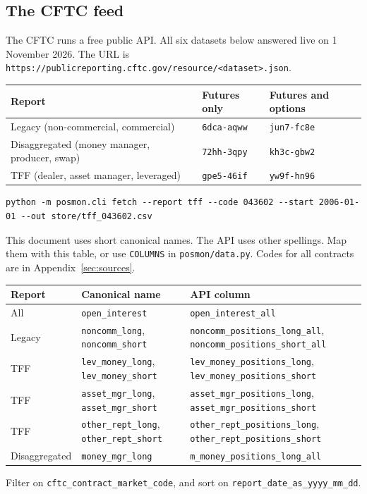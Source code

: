 \documentclass[11pt,a4paper]{article}
\newcommand{\code}[1]{\nolinkurl{#1}}
\newcommand{\sublabel}[1]{\par\vspace{3pt}\needspace{3\baselineskip}{\sffamily\small\bfseries #1}\par\nopagebreak[4]\vspace{1pt}}
\begin{document}
\subsection{The CFTC feed}

The CFTC runs a free public API. All six datasets below answered live on 1 November 2026. The URL is \code{https://publicreporting.cftc.gov/resource/<dataset>.json}.

\begin{center}\small
\begin{tabular}{@{}lll@{}}
\toprule
Report & Futures only & Futures and options \\
\midrule
Legacy (non-commercial, commercial) & \code{6dca-aqww} & \code{jun7-fc8e} \\
Disaggregated (money manager, producer, swap) & \code{72hh-3qpy} & \code{kh3c-gbw2} \\
TFF (dealer, asset manager, leveraged) & \code{gpe5-46if} & \code{yw9f-hn96} \\
\bottomrule
\end{tabular}
\end{center}

\begin{lstlisting}[style=shell]
python -m posmon.cli fetch --report tff --code 043602 --start 2006-01-01 --out store/tff_043602.csv
\end{lstlisting}

\sublabel{Field names}
This document uses short canonical names. The API uses other spellings. Map them with this table, or use \code{COLUMNS} in \code{posmon/data.py}. Codes for all contracts are in Appendix~\ref{sec:sources}.
\small
\begin{tabularx}{\linewidth}{@{}lLL@{}}
\toprule
Report & Canonical name & API column \\
\midrule
All & \code{open_interest} & \code{open_interest_all} \\
Legacy & \code{noncomm_long}, \code{noncomm_short} & \code{noncomm_positions_long_all}, \code{noncomm_positions_short_all} \\
TFF & \code{lev_money_long}, \code{lev_money_short} & \code{lev_money_positions_long}, \code{lev_money_positions_short} \\
TFF & \code{asset_mgr_long}, \code{asset_mgr_short} & \code{asset_mgr_positions_long}, \code{asset_mgr_positions_short} \\
TFF & \code{other_rept_long}, \code{other_rept_short} & \code{other_rept_positions_long}, \code{other_rept_positions_short} \\
Disaggregated & \code{money_mgr_long} & \code{m_money_positions_long_all} \\
\bottomrule
\end{tabularx}
\normalsize
Filter on \code{cftc_contract_market_code}, and sort on \code{report_date_as_yyyy_mm_dd}.
\end{document}
